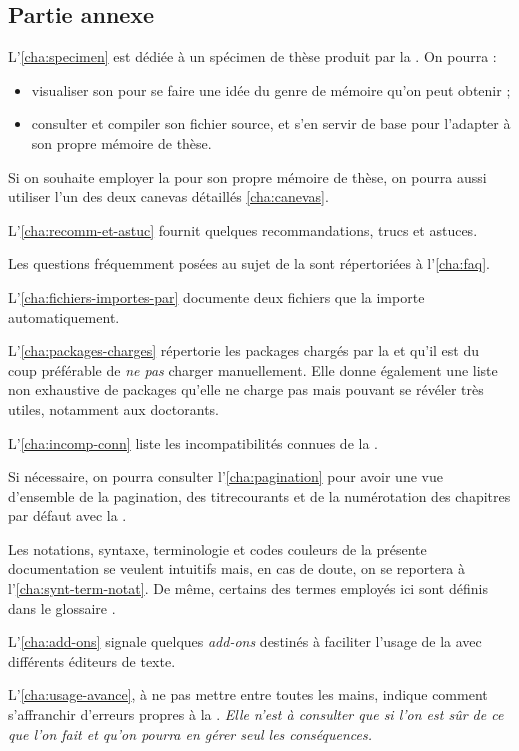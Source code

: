 \subsection{Partie annexe}
\label{sec:partie-annexe}

L'\vref{cha:specimen} est dédiée à un spécimen de thèse produit par la
\yatcl{}. On pourra :
\begin{itemize}
\item visualiser son  pour se faire une idée du genre de mémoire
  qu'on peut obtenir ;
\item consulter et compiler son fichier source, et s'en servir de base pour
  l'adapter à son propre mémoire de thèse.
\end{itemize}

Si on souhaite employer la \yatcl{} pour son propre mémoire de thèse, on pourra
aussi utiliser l'un des deux canevas détaillés \vref{cha:canevas}.

L'\vref{cha:recomm-et-astuc} fournit quelques recommandations, trucs et
astuces.

Les questions fréquemment posées au sujet de la \yatcl{} sont répertoriées
à l'\vref{cha:faq}.

L'\vref{cha:fichiers-importes-par} documente deux fichiers que la \yatcl{}
importe automatiquement.

L'\vref{cha:packages-charges} répertorie les packages chargés par la \yatcl{}
et qu'il est du coup préférable de \emph{ne pas} charger manuellement. Elle
donne également une liste non exhaustive de packages qu'elle ne charge pas mais
pouvant se révéler très utiles, notamment aux doctorants.

L'\vref{cha:incomp-conn} liste les incompatibilités connues de la \yatcl{}.

Si nécessaire, on pourra consulter l'\vref{cha:pagination} pour avoir une vue
d'ensemble de la \gls{pagination}, des \glspl{titrecourant} et de la
numérotation des chapitres par défaut avec la \yatcl{}.

Les notations, syntaxe, terminologie et codes couleurs de la présente
documentation se veulent intuitifs mais, en cas de doute, on se reportera
à l'\vref{cha:synt-term-notat}. De même, certains des termes employés ici sont
définis dans le glossaire .

L'\vref{cha:add-ons} signale quelques \emph{add-ons} destinés à faciliter
l'usage de la \yatcl{} avec différents éditeurs de texte.

L'\vref{cha:usage-avance}, à ne pas mettre entre toutes les mains, indique
comment s'affranchir d'erreurs propres à la \yatcl{}. \emph{Elle n'est
  à consulter que si l'on est sûr de ce que l'on fait et qu'on pourra en gérer
  \emph{seul} les conséquences.}

